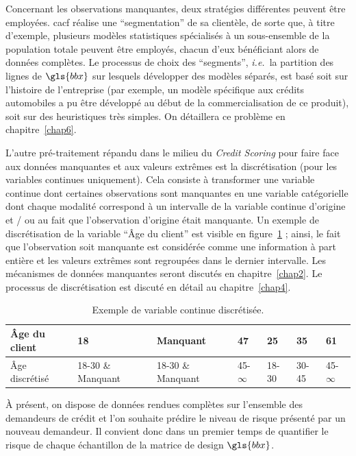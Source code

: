 Concernant les observations manquantes, deux stratégies différentes peuvent être employées. \gls{cacf} réalise une ``segmentation'' de sa clientèle, de sorte que, à titre d'exemple, plusieurs modèles statistiques spécialisés à un sous-ensemble de la population totale peuvent être employés, chacun d'eux bénéficiant alors de données complètes. 
Le processus de choix des ``segments'', \textit{i.e.}\ la partition des lignes de $\gls{bbx}$ sur lesquels développer des modèles séparés, est basé soit sur l'histoire de l'entreprise (par exemple, un modèle spécifique aux crédits automobiles a pu être développé au début de la commercialisation de ce produit), soit sur des heuristiques très simples. On détaillera ce problème en chapitre~\ref{chap6}.

L'autre pré-traitement répandu dans le milieu du \textit{Credit Scoring} pour faire face aux données manquantes et aux valeurs extrêmes est la discrétisation (pour les variables continues uniquement). Cela consiste à transformer une variable continue dont certaines observations sont manquantes en une variable catégorielle dont chaque modalité correspond à un intervalle de la variable continue d'origine et / ou au fait que l'observation d'origine était manquante. Un exemple de discrétisation de la variable ``Âge du client'' est visible en figure~\ref{tab:disc_ex} ; ainsi, le fait que l'observation soit manquante est considérée comme une information à part entière et les valeurs extrêmes sont regroupées dans le dernier intervalle. Les mécanismes de données manquantes seront discutés en chapitre~\ref{chap2}. Le processus de discrétisation est discuté en détail au chapitre~\ref{chap4}.

\begin{table}
\centering
\caption{\label{tab:disc_ex} Exemple de variable continue discrétisée.}
\begin{tabular}{l|l|l|l|l|l|l}
Âge du client & 18 & Manquant & 47 & 25 & 35 & 61 \\
\hline
Âge discrétisé & 18-30 \& Manquant & 18-30 \& Manquant & 45-$\infty$ & 18-30 & 30-45 & 45-$\infty$ \\
\end{tabular}
\end{table}

\`A présent, on dispose de données rendues complètes sur l'ensemble des demandeurs de crédit et l'on souhaite prédire le niveau de risque présenté par un nouveau demandeur. Il convient donc dans un premier temps de quantifier le risque de chaque échantillon de la matrice de design $\gls{bbx}$.

